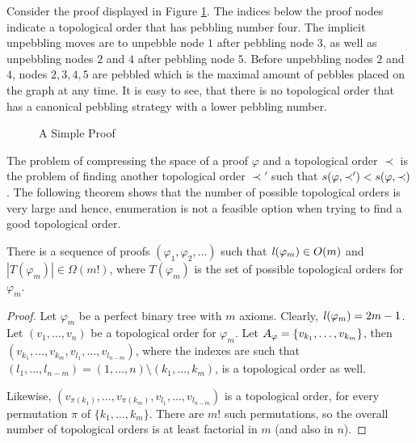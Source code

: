 \begin{example}

Consider the proof displayed in Figure \ref{fig:spaceproof}.
The indices below the proof nodes indicate a topological order that has pebbling number four.
The implicit unpebbling moves are to unpebble node $1$ after pebbling node $3$, as well as unpebbling nodes $2$ and $4$ after pebbling node $5$.
Before unpebbling nodes $2$ and $4$, nodes $2,3,4,5$ are pebbled which is the maximal amount of pebbles placed on the graph at any time.
It is easy to see, that there is no topological order that has a canonical pebbling strategy with a lower pebbling number.

\begin{figure}[!h]

\caption{A Simple Proof}
\label{fig:spaceproof}
\end{figure}

\end{example}

The problem of compressing the space of a proof $\varphi$ and a topological order $\prec$ is the problem of finding another topological order $\prec'$ such that $s(\varphi,\prec') < s(\varphi,\prec)$. The following theorem shows that the number of possible topological orders is very large and hence, enumeration is not a feasible option when trying to find a good topological order.

\begin{theorem}
\label{theorem:enumeration}
There is a sequence of proofs $(\varphi_1,\varphi_2,\ldots)$ such that $\mathit{l}(\varphi_m) \in O(m)$ and $|T(\varphi_m)| \in \Omega(m!)$, where $T(\varphi_m)$ is the set of possible topological orders for $\varphi_m$.
\end{theorem}
\begin{proof}
Let $\varphi_m$ be a perfect binary tree with $m$ axioms. Clearly, $\mathit{l}(\varphi_m) = 2m-1$.
Let $(v_1,\ldots,v_n)$ be a topological order for $\varphi_m$. 
Let $A_{\varphi} = \{v_{k_1},\ldots,v_{k_m}\}$, then $(v_{k_1},\ldots,v_{k_m},v_{l_1},\ldots,v_{l_{n-m}})$, 
where the indexes are such that $(l_1,\ldots,l_{n-m}) = (1,\ldots,n) \setminus (k_1,\ldots,k_m)$, is a topological order as well. 

Likewise, $(v_{\pi({k_1})},\ldots,v_{\pi({k_m})},v_{l_1},\ldots,v_{l_{n-m}})$ is a topological order, for every permutation $\pi$ of $\{k_1,\ldots,k_m\}$. There are $m!$ such permutations, so the overall number of topological orders is at least factorial in $m$ (and also in $n$).
\end{proof}

